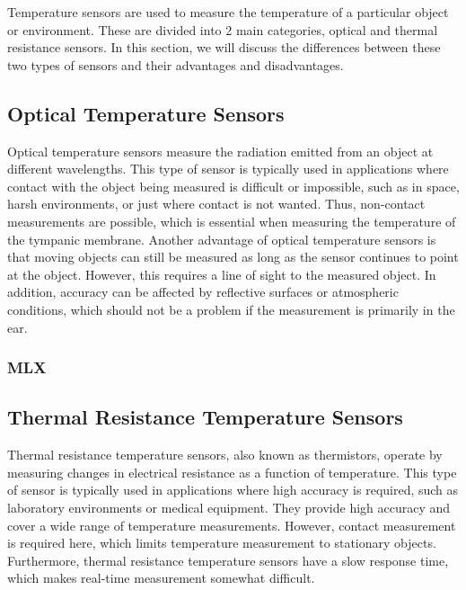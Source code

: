 Temperature sensors are used to measure the temperature of a particular object or environment.
These are divided into 2 main categories, optical and thermal resistance sensors.
In this section, we will discuss the differences between these two types of sensors and their advantages and disadvantages.


\subsection{Optical Temperature Sensors}
Optical temperature sensors measure the radiation emitted from an object at different wavelengths. 
This type of sensor is typically used in applications where contact with the object being measured is difficult or impossible, such as in space, harsh environments, or just where contact is not wanted.
Thus, non-contact measurements are possible, which is essential when measuring the temperature of the tympanic membrane.
Another advantage of optical temperature sensors is that moving objects can still be measured as long as the sensor continues to point at the object.
However, this requires a line of sight to the measured object.
In addition, accuracy can be affected by reflective surfaces or atmospheric conditions, which should not be a problem if the measurement is primarily in the ear.

\subsubsection{MLX}

\subsection{Thermal Resistance Temperature Sensors}
Thermal resistance temperature sensors, also known as thermistors, operate by measuring changes in electrical resistance as a function of temperature. 
This type of sensor is typically used in applications where high accuracy is required, such as laboratory environments or medical equipment.
They provide high accuracy and cover a wide range of temperature measurements.
However, contact measurement is required here, which limits temperature measurement to stationary objects.
Furthermore, thermal resistance temperature sensors have a slow response time, which makes real-time measurement somewhat difficult.

